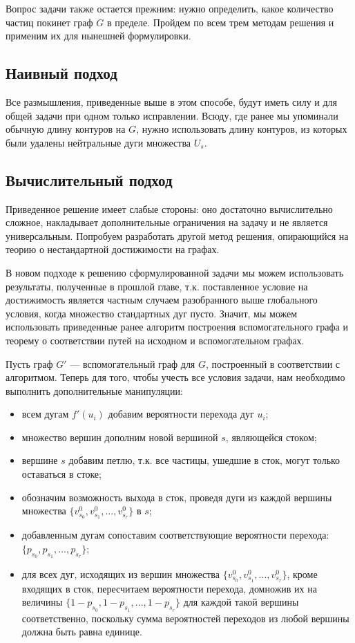 Вопрос задачи также остается прежним: нужно определить, какое количество частиц покинет граф $G$ в пределе. Пройдем по всем трем методам решения и применим их для нынешней формулировки. 

\subsection{Наивный подход}

Все размышления, приведенные выше в этом способе, будут иметь силу и для общей задачи при одном только исправлении. Всюду, где ранее мы упоминали обычную длину контуров на $G$, нужно использовать длину контуров, из которых были удалены нейтральные дуги множества $U_s$. 

\subsection{Вычислительный подход}

Приведенное решение имеет слабые стороны: оно достаточно вычислительно сложное, накладывает дополнительные ограничения на задачу и не является универсальным. Попробуем разработать другой метод решения, опирающийся на теорию о нестандартной достижимости на графах. 

В новом подходе к решению сформулированной задачи мы можем использовать результаты, полученные в прошлой главе, т.к. поставленное условие на достижимость является частным случаем разобранного выше глобального условия, когда множество стандартных дуг пусто. Значит, мы можем использовать приведенные ранее алгоритм построения вспомогательного графа и теорему о соответствии путей на исходном и вспомогательном графах.  

Пусть граф $G'$ --- вспомогательный граф для $G$, построенный в соответствии с алгоритмом. Теперь для того, чтобы учесть все условия задачи, нам необходимо выполнить дополнительные манипуляции:

\begin{itemize}
	\item всем дугам $f'(u_i)$ добавим вероятности перехода дуг $u_i$;
	\item множество вершин дополним новой вершиной $s$, являющейся стоком;
	\item вершине $s$ добавим петлю, т.к. все частицы, ушедшие в сток, могут только оставаться в стоке;
	\item обозначим возможность выхода в сток, проведя дуги из каждой вершины множества $\{v^0_{s_0}, v^0_{s_1}, ... , v^0_{s_r}\}$ в $s$;
	\item добавленным дугам сопоставим соответствующие вероятности перехода: $\{p_{s_0}, p_{s_1}, ... , p_{s_r}\}$;
	\item для всех дуг, исходящих из вершин множества $\{v^0_{s_0}, v^0_{s_1}, ... , v^0_{s_r}\}$, кроме входящих в сток, пересчитаем вероятности перехода, 
	домножив их на величины $\{ 1 - p_{s_0}, 1 - p_{s_1}, ... , 1 - p_{s_r}\}$ для каждой такой вершины соответственно, поскольку сумма вероятностей переходов из любой вершины должна быть равна единице.
\end{itemize}	

